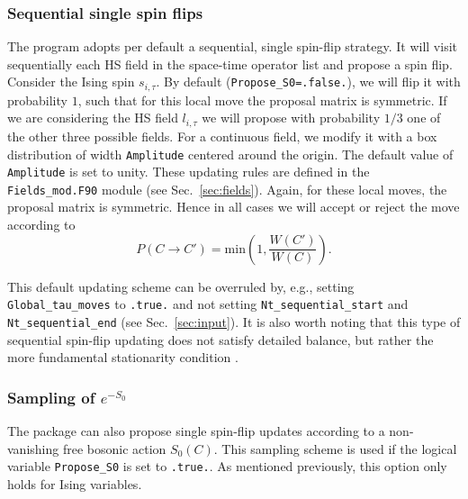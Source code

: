 \subsubsection{Sequential single spin flips}
%
\label{sec:sequential}
The program adopts per default a sequential, single spin-flip strategy. It will visit sequentially each HS field in the space-time operator list and  propose a spin flip. Consider  the Ising spin $s_{i,\tau}$. By default (\texttt{Propose\_S0=.false.}), we will flip it with probability $1$, such that for  this local move  the  proposal matrix is symmetric.  If we are considering the HS field $l_{i,\tau}$  we will propose with probability $1/3$ one  of the other three  possible fields.    For a continuous field, we  modify it with a box distribution of width \texttt{Amplitude}  centered around the origin.   The default value of  \texttt{Amplitude} is set to unity. These updating rules are defined in the   \texttt{Fields\_mod.F90} module  (see Sec.~\ref{sec:fields}). Again, for these local moves, the proposal matrix is symmetric.  Hence in all cases we will accept or reject the move according to 
\begin{equation}
P(C \rightarrow C') =  \text{min}  \left( 1, \frac{ W(C')}{W(C)} \right).
\end{equation}

This default updating scheme can be overruled by, e.g., setting \texttt{Global\_tau\_moves} to \texttt{.true.} and not setting \texttt{Nt\_sequential\_start} and \texttt{Nt\_sequential\_end} (see Sec.~\ref{sec:input}).
It is also worth noting that this type of sequential spin-flip updating does not satisfy detailed balance, but rather the more fundamental stationarity condition \cite{Sokal89}. 


% 
\subsubsection{Sampling of $e^{-S_0}$}
\label{sec:S0}
% 
The package can also propose single spin-flip updates according to a non-vanishing free bosonic action $S_0(C)$. This sampling scheme is used if the logical variable \texttt{Propose\_S0} is set to \texttt{.true.}.   As mentioned previously, this option only holds for Ising variables. 

